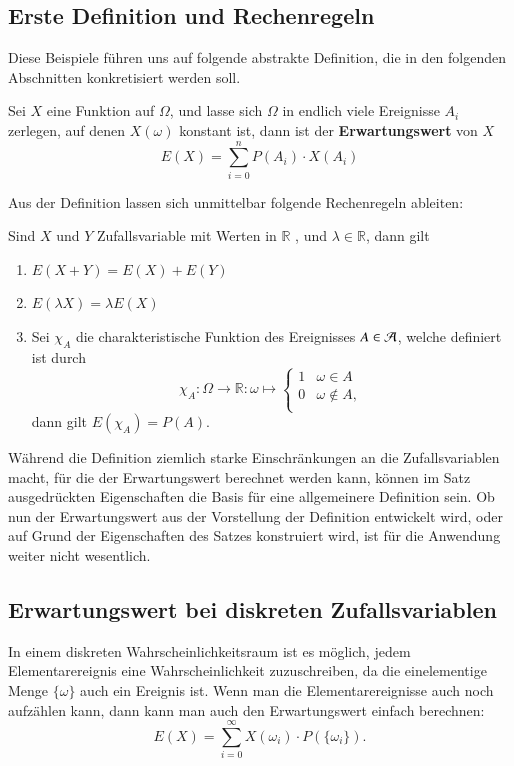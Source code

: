 \subsection{Erste Definition und Rechenregeln}
Diese Beispiele führen uns auf folgende abstrakte Definition,
die in den folgenden Abschnitten konkretisiert werden soll.

\begin{definition}
Sei $X$ eine Funktion auf $\Omega$, und lasse sich $\Omega$ in endlich
viele Ereignisse $A_i$ zerlegen, auf denen $X(\omega)$ konstant ist,
dann ist der {\bf Erwartungswert} von $X$
\[
E(X)=\sum_{i=0}^nP(A_i)\cdot X(A_i)
\]
\end{definition}
Aus der Definition lassen sich unmittelbar folgende Rechenregeln ableiten:
\begin{satz}
\label{rechenregeln-erwartungswert}
Sind $X$ und $Y$ Zufallsvariable mit Werten in $\mathbb{R}$ ,
und $\lambda\in\mathbb{R}$, dann gilt
\begin{enumerate}
\item $E(X+Y)=E(X)+E(Y)$
\item $E(\lambda X)=\lambda E(X)$
\item Sei $\chi_A$ die charakteristische Funktion des Ereignisses $A\in{\cal A}$,
welche definiert ist durch
\[
\chi_A\colon\Omega\to\mathbb{R}:\omega\mapsto\begin{cases}
1&\omega\in A\\
0&\omega\not\in A,\\
\end{cases}
\]
dann gilt $E(\chi_A)=P(A)$.
\end{enumerate}
\end{satz}
Während die Definition ziemlich starke Einschränkungen an die Zufallsvariablen
macht, für die der Erwartungswert berechnet werden kann, können
im Satz ausgedrückten Eigenschaften die Basis für eine allgemeinere
Definition sein.
Ob nun der Erwartungswert aus der Vorstellung der Definition
entwickelt wird, oder auf Grund der Eigenschaften des Satzes konstruiert
wird, ist für die Anwendung weiter nicht wesentlich.

\subsection{Erwartungswert bei diskreten Zufallsvariablen}
In einem diskreten Wahrscheinlichkeitsraum ist es möglich, jedem
Elementarereignis eine Wahrscheinlichkeit zuzuschreiben, da die
einelementige Menge $\{\omega\}$ auch ein Ereignis ist.
Wenn man
die Elementarereignisse auch noch aufzählen kann, dann kann man
auch den Erwartungswert einfach berechnen:
\[
E(X)=\sum_{i=0}^\infty X(\omega_i)\cdot P(\{\omega_i\}).
\]
